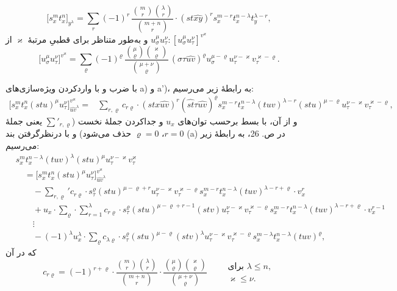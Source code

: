\documentclass[11pt]{article}
\begin{document}
\[
\bigl[s_x^m t_x^n\bigr]_{y^\lambda}
=\sum_r (-1)^r\,
\frac{\binom{m}{r}\binom{\lambda}{r}}{\binom{m+n}{r}}\cdot
(st\widehat{xy})^r s_x^{m-r}t_x^{n-\lambda}t_y^{\lambda-r},
\]
و به‌طور متناظر برای قطبیِ مرتبهٔ $\varkappa$ از $u_\sigma^\mu u_\tau^\nu:[u_\sigma^\mu u_\tau^\nu]^{v^\varkappa}$
\[
\bigl[u_\sigma^\mu u_\tau^\nu\bigr]^{v^\varkappa}
=\sum_\varrho (-1)^\varrho\,
\frac{\binom{\mu}{\varrho}\binom{\varkappa}{\varrho}}{\binom{\mu+\nu}{\varrho}}\,
(\sigma\tau\widehat{uv})^\varrho u_\sigma^{\mu-\varrho}u_\tau^{\nu-\varkappa}v_\tau^{\varkappa-\varrho}.
\]

با ضرب و با واردکردن ویژه‌سازی‌های a) و a')، به رابطهٔ زیر می‌رسیم:
\[
\begin{aligned}
\bigl[s_x^m t_x^n(stu)^\mu u_\tau^\nu\bigr]_{\widehat{uv}^{\lambda}}^{v^\varkappa}
={}&
\sum_{r,\varrho}c_{r\varrho}\cdot
(stx\widehat{uv})^r(\widehat{st}\tau\widehat{uv})^\varrho
s_x^{m-r}t_x^{n-\lambda}(tuv)^{\lambda-r}(stu)^{\mu-\varrho}
u_\tau^{\nu-\varkappa}v_\tau^{\varkappa-\varrho},
\end{aligned}
\]
و از آن، با بسط برحسب توان‌های $u_x$ و جداکردن جملهٔ نخست ($\sum'_{r,\varrho}$ یعنی جملهٔ $r=0$، $\varrho=0$ حذف می‌شود) و با درنظرگرفتن بند (a) در ص. 26، به رابطهٔ زیر می‌رسیم:
\[
\tag{II}
\begin{aligned}
&s_x^m t_x^{n-\lambda}(tuv)^\lambda(stu)^\mu u_\tau^{\nu-\varkappa}v_\tau^\varkappa\\
&\quad =
\bigl[s_x^m t_x^n(stu)^\mu u_\tau^\nu\bigr]_{\widehat{uv}^{\lambda}}^{v^\varkappa}\\
&\qquad
-\sum_{r,\varrho}' c_{r\varrho}\cdot s_\tau^\varrho(stu)^{\mu-\varrho+r}
u_\tau^{\nu-\varkappa}v_\tau^{\varkappa-\varrho}
s_x^{m-r}t_x^{n-\lambda}(tuv)^{\lambda-r+\varrho}\cdot v_x^r\\
&\qquad
+u_x\cdot\sum_{\varrho}\cdot\sum_{r=1}^{\lambda} c_{r\varrho}\cdot
s_\tau^\varrho(stu)^{\mu-\varrho+r-1}(stv)
u_\tau^{\nu-\varkappa}v_\tau^{\varkappa-\varrho}
s_x^{m-r}t_x^{n-\lambda}(tuv)^{\lambda-r+\varrho}\cdot v_x^{r-1}\\
&\qquad
\vdots\\
&\qquad
-(-1)^\lambda u_x^\lambda\cdot\sum_\varrho c_{\lambda\varrho}\cdot
s_\tau^\varrho(stu)^{\mu-\varrho}(stv)^\lambda
u_\tau^{\nu-\varkappa}v_\tau^{\varkappa-\varrho}
s_x^{m-\lambda}t_x^{n-\lambda}(tuv)^\varrho,
\end{aligned}
\]
که در آن
\[
c_{r\varrho}=(-1)^{r+\varrho}\cdot
\frac{\binom{m}{r}\binom{\lambda}{r}}{\binom{m+n}{r}}\cdot
\frac{\binom{\mu}{\varrho}\binom{\varkappa}{\varrho}}{\binom{\mu+\nu}{\varrho}}
\qquad
\begin{array}{l}
\text{برای }\lambda\le n,\\
\varkappa\le\nu.
\end{array}
\]
\end{document}
